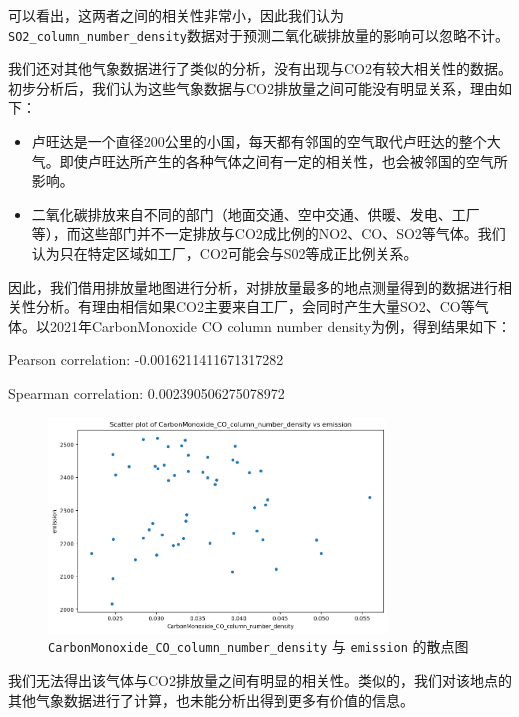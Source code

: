 \documentclass{ctexart}
\begin{document}
可以看出，这两者之间的相关性非常小，因此我们认为\texttt{SO2\_column\_number\_density}数据对于预测二氧化碳排放量的影响可以忽略不计。

我们还对其他气象数据进行了类似的分析，没有出现与CO2有较大相关性的数据。初步分析后，我们认为这些气象数据与CO2排放量之间可能没有明显关系，理由如下：

\begin{itemize}
      \item 卢旺达是一个直径200公里的小国，每天都有邻国的空气取代卢旺达的整个大气。即使卢旺达所产生的各种气体之间有一定的相关性，也会被邻国的空气所影响。
      \item 二氧化碳排放来自不同的部门（地面交通、空中交通、供暖、发电、工厂等），而这些部门并不一定排放与CO2成比例的NO2、CO、SO2等气体。我们认为只在特定区域如工厂，CO2可能会与S02等成正比例关系。
\end{itemize}

因此，我们借用排放量地图进行分析，对排放量最多的地点测量得到的数据进行相关性分析。有理由相信如果CO2主要来自工厂，会同时产生大量SO2、CO等气体。以2021年CarbonMonoxide CO column number density为例，得到结果如下：

\begin{center}
      Pearson correlation: -0.0016211411671317282

      Spearman correlation: 0.002390506275078972
\end{center}

\begin{figure}[H]
      \centering
      \includegraphics[width=0.8\textwidth]{output7.png}
      \caption{\texttt{CarbonMonoxide\_CO\_column\_number\_density} 与 \texttt{emission} 的散点图}
\end{figure}

我们无法得出该气体与CO2排放量之间有明显的相关性。类似的，我们对该地点的其他气象数据进行了计算，也未能分析出得到更多有价值的信息。
\end{document}
